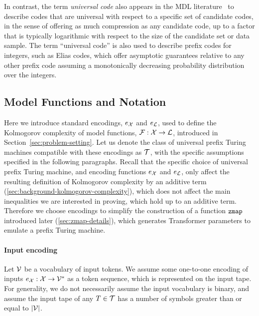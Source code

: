 In contrast, the term \emph{universal code} also appears in the MDL literature~\citep{grunwald2004tutorial} to describe codes that are universal with respect to a specific set of candidate codes, in the sense of offering as much compression as any candidate code, up to a factor that is typically logarithmic with respect to the size of the candidate set or data sample. The term ``universal code'' is also used to describe prefix codes for integers, such as Elias codes, which offer asymptotic guarantees relative to any other prefix code assuming a monotonically decreasing probability distribution over the integers. 

\subsection{Model Functions and Notation}
\label{sec:reference-machine-and-notation}

Here we introduce standard encodings, $e_{\mathcal{X}}$ and $e_{\mathcal{L}}$, used to define the Kolmogorov complexity of model functions, ${\mathcal{F}} : {\mathcal{X}} \rightarrow {\mathcal{L}}$, introduced in Section~\ref{sec:problem-setting}. Let us denote the class of universal prefix Turing machines compatible with these encodings as ${\mathcal{T}}$, with the specific assumptions specified in the following paragraphs. Recall that the specific choice of universal prefix Turing machine, and encoding functions $e_{\mathcal{X}}$ and $e_{\mathcal{L}}$, only affect the resulting definition of Kolmogorov complexity by an additive term (\ref{sec:background-kolmogorov-complexity}), which does not affect the main inequalities we are interested in proving, which hold up to an additive term. Therefore we choose encodings to simplify the construction of a function $\texttt{zmap}$ introduced later (\ref{sec:zmap-details}), which generates Transformer parameters to emulate a prefix Turing machine.

\paragraph{Input encoding} Let ${\mathcal{V}}$ be a vocabulary of input tokens. We assume some one-to-one encoding of inputs $e_{\mathcal{X}} : {\mathcal{X}} \rightarrow {\mathcal{V}}^*$ as a token sequence, which is represented on the input tape. For generality, we do not necessarily assume the input vocabulary is binary, and assume the input tape of any $T \in {\mathcal{T}}$ has a number of symbols greater than or equal to $|{\mathcal{V}}|$.

